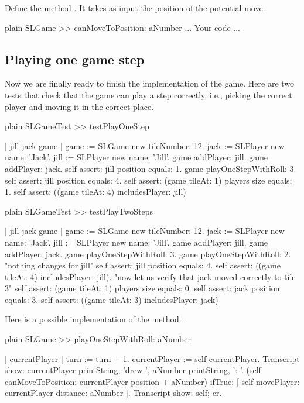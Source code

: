 \documentclass[10pt,twoside,english]{_support/latex/sbabook/sbabook}
\begin{document}
Define the method . It takes as input the position of the potential move. 

\begin{displaycode}{plain}
SLGame >> canMoveToPosition: aNumber
	... Your code ...
\end{displaycode}
\subsection{Playing one game step}
Now we are finally ready to finish the implementation of the game. Here are two tests that check that the game can play a step correctly, i.e., picking the correct player and moving it 
in the correct place. 

\begin{displaycode}{plain}
SLGameTest >> testPlayOneStep
	
	| jill jack game |
	game := SLGame new tileNumber: 12.
	jack := SLPlayer new name: 'Jack'.
	jill := SLPlayer new name: 'Jill'.
	game addPlayer: jill.
	game addPlayer: jack.
	self assert: jill position equals: 1.
	game playOneStepWithRoll: 3.
	self assert: jill position equals: 4.
	self assert: (game tileAt: 1) players size equals: 1.
	self assert: ((game tileAt: 4) includesPlayer: jill)
\end{displaycode}

	

\begin{displaycode}{plain}
SLGameTest >> testPlayTwoSteps
	
	| jill jack game |
	game := SLGame new tileNumber: 12.
	jack := SLPlayer new name: 'Jack'.
	jill := SLPlayer new name: 'Jill'.
	game addPlayer: jill.
	game addPlayer: jack.
	game playOneStepWithRoll: 3.
	game playOneStepWithRoll: 2.
	"nothing changes for jill"
	self assert: jill position equals: 4.
	self assert: ((game tileAt: 4) includesPlayer: jill).
	"now let us verify that jack moved correctly to tile 3"	
	self assert: (game tileAt: 1) players size equals: 0.
	self assert: jack position equals: 3.
	self assert: ((game tileAt: 3) includesPlayer: jack)
\end{displaycode}

	
Here is a possible implementation of the method . 

\begin{displaycode}{plain}
SLGame >> playOneStepWithRoll: aNumber
		
	| currentPlayer |
	turn := turn + 1.
	currentPlayer := self currentPlayer. 
	Transcript show: currentPlayer printString, 'drew ', aNumber printString, ': '. 
	(self canMoveToPosition: currentPlayer position + aNumber)
		ifTrue: [ self movePlayer: currentPlayer distance: aNumber ].
	Transcript show: self; cr.
\end{displaycode}
\end{document}
